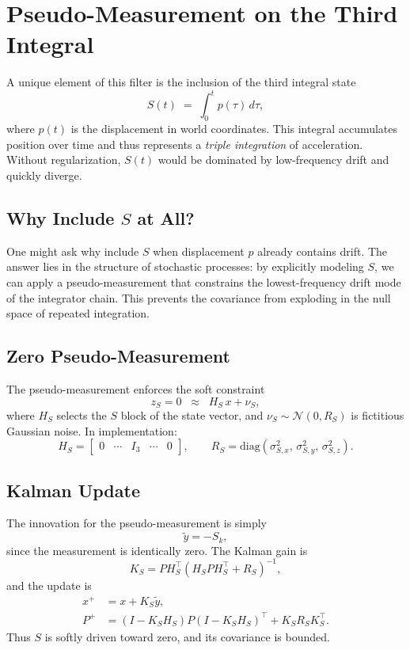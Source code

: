 \documentclass[11pt]{article}
\begin{document}
\section{Pseudo-Measurement on the Third Integral}
\label{sec:pseudo-S}

A unique element of this filter is the inclusion of the third integral state
\[
S(t) \;=\; \int_0^t p(\tau)\,d\tau,
\]
where $p(t)$ is the displacement in world coordinates.
This integral accumulates position over time and thus represents a 
\emph{triple integration} of acceleration. Without regularization, $S(t)$
would be dominated by low-frequency drift and quickly diverge.

\subsection{Why Include $S$ at All?}
One might ask why include $S$ when displacement $p$ already contains drift.
The answer lies in the structure of stochastic processes: by explicitly modeling
$S$, we can apply a pseudo-measurement that constrains the lowest-frequency drift
mode of the integrator chain. This prevents the covariance from exploding in the
null space of repeated integration.

\subsection{Zero Pseudo-Measurement}
The pseudo-measurement enforces the soft constraint
\begin{equation}
z_S = 0 \;\;\approx\;\; H_S\,x + \nu_S,
\label{eq:ps-meas}
\end{equation}
where $H_S$ selects the $S$ block of the state vector, and $\nu_S\sim\mathcal{N}(0,R_S)$
is fictitious Gaussian noise. In implementation:
\begin{equation}
H_S = \begin{bmatrix}0 & \cdots & I_3 & \cdots & 0\end{bmatrix},
\qquad
R_S = \mathrm{diag}(\sigma_{S,x}^2,\,\sigma_{S,y}^2,\,\sigma_{S,z}^2).
\label{eq:ps-HR}
\end{equation}

\subsection{Kalman Update}
The innovation for the pseudo-measurement is simply
\begin{equation}
\tilde y = -S_k,
\end{equation}
since the measurement is identically zero. The Kalman gain is
\begin{equation}
K_S = P H_S^\top (H_S P H_S^\top + R_S)^{-1},
\end{equation}
and the update is
\begin{align}
x^+ &= x + K_S\tilde y,\\
P^+ &= (I-K_SH_S)P(I-K_SH_S)^\top + K_SR_SK_S^\top.
\end{align}
Thus $S$ is softly driven toward zero, and its covariance is bounded.
\end{document}
